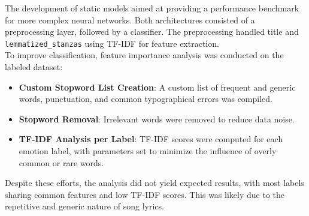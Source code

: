 

The development of static models aimed at providing a performance benchmark for
more complex neural networks.
Both architectures consisted of a preprocessing layer, followed by a classifier.
The preprocessing handled title and \texttt{lemmatized\_stanzas} using TF-IDF for feature
extraction.\\

To improve classification, feature importance analysis was conducted on the
labeled dataset:
\begin{itemize}
    \item \textbf{Custom Stopword List Creation}: A custom list of frequent and generic words, punctuation, and common typographical errors was compiled.
    \item \textbf{Stopword Removal}: Irrelevant words were removed to reduce data noise.
    \item \textbf{TF-IDF Analysis per Label}: TF-IDF scores were computed for each emotion label, with parameters set to minimize the influence of overly common or rare words.
\end{itemize}
Despite these efforts, the analysis did not yield expected results, with most
labels sharing common features and low TF-IDF scores.
This was likely due to the repetitive and generic nature of song lyrics.\\

